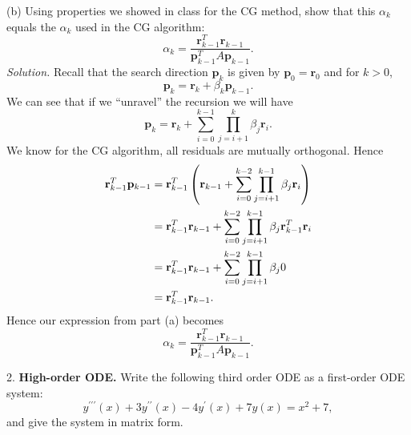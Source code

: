 \documentclass{article}
\def\*#1{\mathbf{#1}}
\begin{document}
(b) Using properties we showed in class for the CG method, show that this $\alpha_k$
equals the $\alpha_k$ used in the CG algorithm:
%
\begin{equation*}
    \alpha_k = \frac{\*r_{k - 1}^T \*r_{k - 1}}{\*p_{k - 1}^T A \*p_{k - 1}}
    .
\end{equation*}
%
\textit{Solution.}
Recall that the search direction $\*p_k$ is given by $\*p_0 = \*r_0$
and for $k > 0$,
%
\begin{equation*}
    \*p_k = \*r_k + \beta_k \*p_{k - 1}
    .
\end{equation*}
%
We can see that if we ``unravel'' the recursion we will have
%
\begin{equation*}
    \*p_k = \*r_k + \sum_{i = 0}^{k - 1} \prod_{j = i + 1}^k \beta_j \*r_{i}
    .
\end{equation*}
%
We know for the CG algorithm, all residuals are mutually orthogonal. Hence
%
\begin{align*}
    \*r_{k - 1}^T \*p_{k - 1}
    &=
    \*r_{k - 1}^T \del{\*r_{k - 1} + \sum_{i = 0}^{k - 2} \prod_{j = i + 1}^{k - 1} \beta_j \*r_{i}}
    \\
    &=
    \*r_{k - 1}^T \*r_{k - 1} + \sum_{i = 0}^{k - 2} \prod_{j = i + 1}^{k - 1} \beta_j \*r_{k - 1}^T \*r_{i}
    \\
    &=
    \*r_{k - 1}^T \*r_{k - 1} + \sum_{i = 0}^{k - 2} \prod_{j = i + 1}^{k - 1} \beta_j 0
    \\
    &= \*r_{k - 1}^T \*r_{k - 1}
    .
\end{align*}
%
Hence our expression from part (a) becomes
%
\begin{equation*}
    \alpha_k = \frac{\*r_{k - 1}^T \*r_{k - 1}}{\*p_{k - 1}^T A \*p_{k - 1}}
    .
\end{equation*}

\newpage

2. \textbf{High-order ODE.}
Write the following third order ODE as a first-order ODE system:
%
\begin{equation*}
    y^{\prime \prime \prime}(x) + 3 y^{\prime \prime}(x) - 4 y^\prime(x) + 7 y(x) = x^2 + 7,
\end{equation*}
%
and give the system in matrix form.
\end{document}
